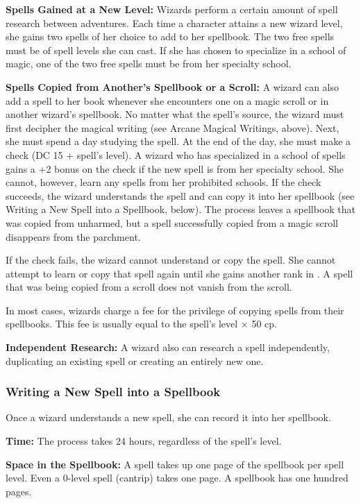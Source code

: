 \textbf{Spells Gained at a New Level:} Wizards perform a certain amount of spell research between adventures. Each time a character attains a new wizard level, she gains two spells of her choice to add to her spellbook. The two free spells must be of spell levels she can cast. If she has chosen to specialize in a school of magic, one of the two free spells must be from her specialty school.

\textbf{Spells Copied from Another's Spellbook or a Scroll:} A wizard can also add a spell to her book whenever she encounters one on a magic scroll or in another wizard's spellbook. No matter what the spell's source, the wizard must first decipher the magical writing (see Arcane Magical Writings, above). Next, she must spend a day studying the spell. At the end of the day, she must make a  check (DC 15 + spell's level). A wizard who has specialized in a school of spells gains a +2 bonus on the  check if the new spell is from her specialty school. She cannot, however, learn any spells from her prohibited schools. If the check succeeds, the wizard understands the spell and can copy it into her spellbook (see Writing a New Spell into a Spellbook, below). The process leaves a spellbook that was copied from unharmed, but a spell successfully copied from a magic scroll disappears from the parchment.

If the check fails, the wizard cannot understand or copy the spell. She cannot attempt to learn or copy that spell again until she gains another rank in . A spell that was being copied from a scroll does not vanish from the scroll.

In most cases, wizards charge a fee for the privilege of copying spells from their spellbooks. This fee is usually equal to the spell's level $\times$ 50 cp.

\textbf{Independent Research:} A wizard also can research a spell independently, duplicating an existing spell or creating an entirely new one.

\subsubsection{Writing a New Spell into a Spellbook}
Once a wizard understands a new spell, she can record it into her spellbook.

\textbf{Time:} The process takes 24 hours, regardless of the spell's level.

\textbf{Space in the Spellbook:} A spell takes up one page of the spellbook per spell level. Even a 0-level spell (cantrip) takes one page. A spellbook has one hundred pages.

